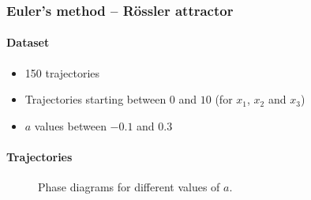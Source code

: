 \begin{frame}
	\frametitle{Euler's method -- R\"ossler attractor}
	\paragraph{Dataset}\vspace{-2mm}
	\begin{itemize}
		\item 150 trajectories
		\item Trajectories starting between $0$ and $10$ (for $x_1$, $x_2$ and $x_3$)
		\item $a$ values between $-0.1$ and $0.3$
	\end{itemize}
	\paragraph{Trajectories}\vspace{-2mm}
	\begin{figure}[H]
		\quad
		\caption{Phase diagrams for different values of $a$.}
	\end{figure}
\end{frame}

